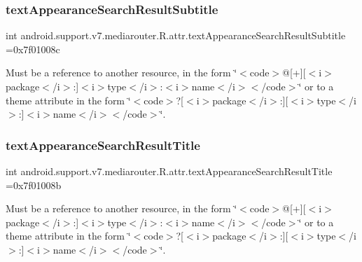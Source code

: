 \subsubsection{\texorpdfstring{text\+Appearance\+Search\+Result\+Subtitle}{textAppearanceSearchResultSubtitle}}
{\footnotesize\ttfamily int android.\+support.\+v7.\+mediarouter.\+R.\+attr.\+text\+Appearance\+Search\+Result\+Subtitle =0x7f01008c\hspace{0.3cm}{\ttfamily [static]}}

Must be a reference to another resource, in the form \char`\"{}$<$code$>$@\mbox{[}+\mbox{]}\mbox{[}$<$i$>$package$<$/i$>$\+:\mbox{]}$<$i$>$type$<$/i$>$\+:$<$i$>$name$<$/i$>$$<$/code$>$\char`\"{} or to a theme attribute in the form \char`\"{}$<$code$>$?\mbox{[}$<$i$>$package$<$/i$>$\+:\mbox{]}\mbox{[}$<$i$>$type$<$/i$>$\+:\mbox{]}$<$i$>$name$<$/i$>$$<$/code$>$\char`\"{}. \mbox{\label{classandroid_1_1support_1_1v7_1_1mediarouter_1_1R_1_1attr_a7d88573dc917c94b61750b6004b11c70}} 
\subsubsection{\texorpdfstring{text\+Appearance\+Search\+Result\+Title}{textAppearanceSearchResultTitle}}
{\footnotesize\ttfamily int android.\+support.\+v7.\+mediarouter.\+R.\+attr.\+text\+Appearance\+Search\+Result\+Title =0x7f01008b\hspace{0.3cm}{\ttfamily [static]}}

Must be a reference to another resource, in the form \char`\"{}$<$code$>$@\mbox{[}+\mbox{]}\mbox{[}$<$i$>$package$<$/i$>$\+:\mbox{]}$<$i$>$type$<$/i$>$\+:$<$i$>$name$<$/i$>$$<$/code$>$\char`\"{} or to a theme attribute in the form \char`\"{}$<$code$>$?\mbox{[}$<$i$>$package$<$/i$>$\+:\mbox{]}\mbox{[}$<$i$>$type$<$/i$>$\+:\mbox{]}$<$i$>$name$<$/i$>$$<$/code$>$\char`\"{}. \mbox{\label{classandroid_1_1support_1_1v7_1_1mediarouter_1_1R_1_1attr_a437c1037939e545ae2295c73d465fbd6}} 
